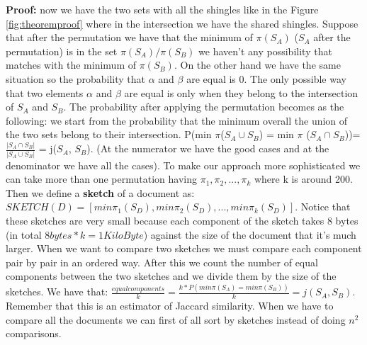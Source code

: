\textbf{Proof:} now we have the two sets with all the shingles like in the Figure \ref{fig:theoremproof} where in the intersection we have the shared shingles. Suppose that after the permutation we have that the minimum of $\pi (S_A)$ ($S_A$ after the permutation) is in the set $\pi (S_A)/\pi (S_B)$ we haven't any possibility that matches with the minimum of $\pi (S_B)$. On the other hand we have the same situation so the probability that $\alpha$ and $\beta$ are equal is 0. The only possible way that two elements $\alpha$ and $\beta$ are equal is only when they belong to the intersection of $S_A$ and $S_B$.\newline
The probability after applying the permutation becomes as the following: we start from the probability that the minimum overall the union of the two sets belong to their intersection. P(min $\pi$($S_A \cup S_B$) = min $\pi$ ($S_A \cap S_B$))=$\frac{|S_A \cap S_B|}{|S_A \cup S_B|}$ = j($S_A$, $S_B$). (At the numerator we have the good cases and at the denominator we have all the cases).\newline
To make our approach more sophisticated we can take more than one permutation having $\pi_1, \pi_2, ..., \pi_k$ where k is around 200. Then we define a \textbf{sketch} of a document as: $SKETCH(D)=[min \pi_1(S_D), min \pi_2(S_D), ..., min \pi_k(S_D)]$. Notice that these sketches are very small because each component of the sketch takes 8 bytes (in total $8 bytes * k=1 Kilo Byte$) against the size of the document that it's much larger.\newline
When we want to compare two sketches we must compare each component pair by pair in an ordered way. After this we count the number of equal components between the two sketches and we divide them by the size of the sketches. We have that: $\frac{equal components}{k}=\frac{k*P(min \pi (S_A)=min \pi (S_B))}{k}=j(S_A,S_B)$. Remember that this is an estimator of Jaccard similarity.\newline
When we have to compare all the documents we can first of all sort by sketches instead of doing $n^2$ comparisons.
